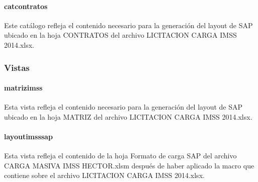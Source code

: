 \paragraph*{cat{\textunderscore}contratos} Este catálogo refleja el contenido necesario para la generación del layout de SAP ubicado en la hoja CONTRATOS del archivo LICITACION  CARGA IMSS 2014.xlsx.


\subsubsection{Vistas}
\paragraph*{matriz{\textunderscore}imss} Esta vista refleja el contenido necesario para la generación del layout de SAP ubicado en la hoja MATRIZ del archivo LICITACION  CARGA IMSS 2014.xlsx.

\paragraph*{layout{\textunderscore}imss{\textunderscore}sap} Esta vista refleja el contenido de la hoja Formato de carga SAP del archivo CARGA MASIVA IMSS HECTOR.xlsm después de haber aplicado la macro que contiene sobre el archivo LICITACION  CARGA IMSS 2014.xlsx.


